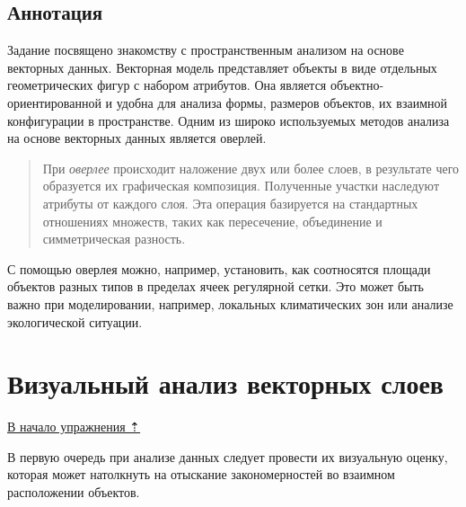 \documentclass[
  12pt,
]{book}
\begin{document}
\hypertarget{spatrelations-annotation}{%
\subsection{Аннотация}\label{spatrelations-annotation}}

Задание посвящено знакомству с пространственным анализом на основе векторных данных. Векторная модель представляет объекты в виде отдельных геометрических фигур с набором атрибутов. Она является объектно-ориентированной и удобна для анализа формы, размеров объектов, их взаимной конфигурации в пространстве. Одним из широко используемых методов анализа на основе векторных данных является оверлей.

\begin{quote}
При \emph{оверлее} происходит наложение двух или более слоев, в результате чего образуется их графическая композиция. Полученные участки наследуют атрибуты от каждого слоя. Эта операция базируется на стандартных отношениях множеств, таких как пересечение, объединение и симметрическая разность.
\end{quote}

С помощью оверлея можно, например, установить, как соотносятся площади объектов разных типов в пределах ячеек регулярной сетки. Это может быть важно при моделировании, например, локальных климатических зон или анализе экологической ситуации.

\hypertarget{spatrelations-vizual}{%
\section{Визуальный анализ векторных слоев}\label{spatrelations-vizual}}

\protect\hyperlink{spatrelations}{В начало упражнения ⇡}

В первую очередь при анализе данных следует провести их визуальную оценку, которая может натолкнуть на отыскание закономерностей во взаимном расположении объектов.
\end{document}
